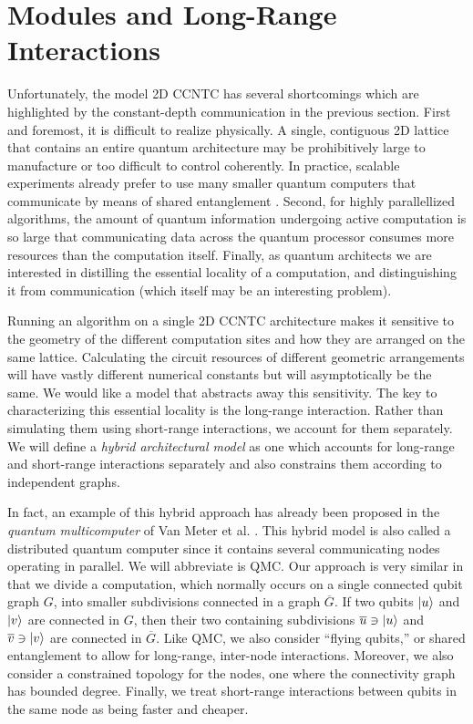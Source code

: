 \section{Modules and Long-Range Interactions}
\label{sec:intro-modules}


Unfortunately, the model \textsf{2D CCNTC} has several shortcomings
which are highlighted by the constant-depth communication in the
previous section. First and foremost, it is difficult to realize physically. 
A single, contiguous
2D lattice that contains an entire quantum architecture
may be prohibitively large to manufacture or too difficult to control
coherently. In practice,
scalable experiments already prefer to use many
smaller quantum computers that communicate by means of shared
entanglement \cite{Monroe2012}. Second, for highly parallellized
algorithms, the amount of quantum information undergoing active
computation is so large that communicating data across the
quantum processor consumes more resources than the computation
itself. Finally, as quantum architects we are interested in distilling
the essential locality of a computation, and distinguishing it from
communication (which itself may be an interesting problem).

Running an
algorithm on a single \textsf{2D CCNTC} architecture makes it
sensitive to the geometry of the different computation sites and how they
are arranged on the same lattice. Calculating the circuit resources of different
geometric arrangements will have vastly different numerical constants but will asymptotically
be the same. We would like a model that abstracts away this sensitivity.
The key to characterizing this essential locality is the long-range interaction. Rather than simulating them using short-range interactions,
we account for them separately. We will define a
\emph{hybrid architectural model} as one which accounts for long-range
and short-range interactions separately and also constrains them
according to independent graphs.

In fact, an example of this hybrid approach has already been proposed
in the \emph{quantum multicomputer} of Van Meter et al. \cite{VanMeter2008}.
This hybrid model is also called a distributed quantum computer since it contains several communicating nodes operating in parallel.
We will abbreviate is \textsf{QMC}.
Our approach is
very similar in that we divide a computation, which normally occurs on a single connected qubit graph $G$, into smaller subdivisions connected in
a graph $\overline{G}$. If two qubits $\left\vert{u}\right\rangle$ and $\left\vert{v}\right\rangle$ are connected
in $G$, then their two containing subdivisions $\overline{u} \ni \left\vert{u}\right\rangle$
and $\overline{v} \ni \left\vert{v}\right\rangle$ are connected in $\overline{G}$.
Like \textsf{QMC}, we also consider ``flying qubits,'' or shared
entanglement to allow for long-range, inter-node interactions. Moreover,
we also
consider a constrained topology for the nodes, one where the connectivity
graph has bounded degree. Finally, we treat short-range interactions between
qubits in the same node as being faster and cheaper.

